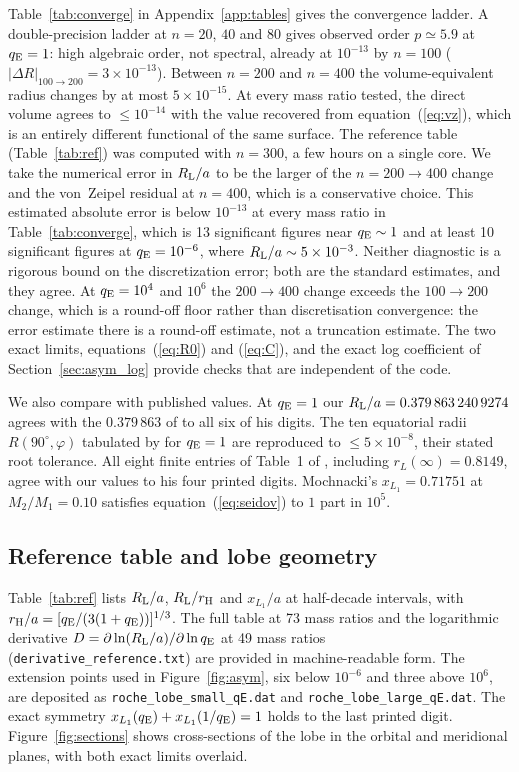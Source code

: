 \documentclass[twocolumn]{aastex702}
\newcommand{\qE}{q_{\rm E}}
\newcommand{\RL}{R_{\rm L}}
\begin{document}
Table~\ref{tab:converge} in Appendix~\ref{app:tables} gives the convergence ladder. A double-precision ladder at $n=20$, $40$ and $80$ gives observed order $p\simeq5.9$ at $\qE=1$: high algebraic order, not spectral, already at $10^{-13}$ by $n=100$ ($|\Delta R|_{100\to200}=3\times10^{-13}$). Between $n=200$ and $n=400$ the volume-equivalent radius changes by at most $5\times10^{-15}$. At every mass ratio tested, the direct volume agrees to $\le10^{-14}$ with the value recovered from equation~(\ref{eq:vz}), which is an entirely different functional of the same surface. The reference table (Table~\ref{tab:ref}) was computed with $n=300$, a few hours on a single core. We take the numerical error in $\RL/a$ to be the larger of the $n=200\to400$ change and the von~Zeipel residual at $n=400$, which is a conservative choice. This estimated absolute error is below $10^{-13}$ at every mass ratio in Table~\ref{tab:converge}, which is 13 significant figures near $\qE\sim1$ and at least 10 significant figures at $\qE=10^{-6}$, where $\RL/a\sim5\times10^{-3}$. Neither diagnostic is a rigorous bound on the discretization error; both are the standard estimates, and they agree. At $\qE=10^{4}$ and $10^{6}$ the $200\to400$ change exceeds the $100\to200$ change, which is a round-off floor rather than discretisation convergence: the error estimate there is a round-off estimate, not a truncation estimate. The two exact limits, equations~(\ref{eq:R0}) and (\ref{eq:C}), and the exact log coefficient of Section~\ref{sec:asym_log} provide checks that are independent of the code.

We also compare with published values. At $\qE=1$ our $\RL/a=0.379\,863\,240\,9274$ agrees with the $0.379\,863$ of \citet{Mochnacki1984} to all six of his digits. The ten equatorial radii $R(90^\circ,\varphi)$ tabulated by \citet{LeahyLeahy2015} for $\qE=1$ are reproduced to $\le5\times10^{-8}$, their stated root tolerance. All eight finite entries of Table~1 of \citet{Eggleton1983}, including $r_L(\infty)=0.8149$, agree with our values to his four printed digits. Mochnacki's $x_{L_1}=0.71751$ at $M_2/M_1=0.10$ satisfies equation~(\ref{eq:seidov}) to $1$ part in $10^5$.

\subsection{Reference table and lobe geometry}\label{sec:table}

Table~\ref{tab:ref} lists $\RL/a$, $\RL/r_{\rm H}$ and $x_{L_1}/a$ at half-decade intervals, with $r_{\rm H}/a=[\qE/(3(1+\qE))]^{1/3}$. The full table at 73 mass ratios and the logarithmic derivative $D=\partial\ln(\RL/a)/\partial\ln\qE$ at 49 mass ratios (\texttt{derivative\_reference.txt}) are provided in machine-readable form. The extension points used in Figure~\ref{fig:asym}, six below $10^{-6}$ and three above $10^{6}$, are deposited as \texttt{roche\_lobe\_small\_qE.dat} and \texttt{roche\_lobe\_large\_qE.dat}. The exact symmetry $x_{L_1}(\qE)+x_{L_1}(1/\qE)=1$ holds to the last printed digit. Figure~\ref{fig:sections} shows cross-sections of the lobe in the orbital and meridional planes, with both exact limits overlaid.
\end{document}
